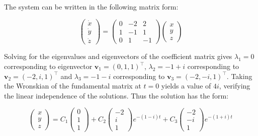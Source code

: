 \documentclass[12pt]{article}
\begin{document}

The system can be written in the following matrix form:

\begin{equation}
    \begin{pmatrix}
        \dot{x} \\
        \dot{y} \\
        \dot{z}
    \end{pmatrix}
    =
    \begin{pmatrix}
        0 & -2 & 2  \\
        1 & -1 & 1  \\
        0 & 1  & -1
    \end{pmatrix}
    \begin{pmatrix}
        x \\
        y \\
        z
    \end{pmatrix}
\end{equation}

Solving for the eigenvalues and eigenvectors of the coefficient matrix gives $\lambda_{1} = 0$ corresponding to eigenvector $\mathbf{v}_{1} = (0, 1, 1)^{\intercal}$, $\lambda_{2} = -1 + i$ corresponding to $\mathbf{v}_{2} = (-2, i, 1)^{\intercal}$ and $\lambda_{3} = -1 - i$ corresponding to $\mathbf{v}_{3} = (-2, -i, 1)^{\intercal}$. Taking the Wronskian of the fundamental matrix at $t = 0$ yields a value of $4i$, verifying the linear independence of the solutions. Thus the solution has the form:

\begin{equation}
    \begin{pmatrix}
        x \\
        y \\
        z
    \end{pmatrix}
    =
    C_{1} \begin{pmatrix}
        0 \\
        1 \\
        1
    \end{pmatrix}
    +
    C_{2} \begin{pmatrix}
        -2 \\
        i  \\
        1
    \end{pmatrix}
    e^{-(1 - i)t}
    +
    C_{3} \begin{pmatrix}
        -2 \\
        -i \\
        1
    \end{pmatrix}
    e^{-(1 + i)t}
\end{equation}
\end{document}
